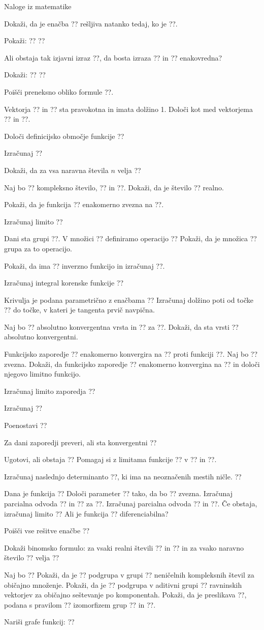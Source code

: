 \documentclass[a4paper,12pt]{article}
\begin{document}
Naloge iz matematike

Dokaži, da je enačba ??
rešljiva natanko tedaj, ko je ??.

Pokaži:
??
??

Ali obstaja tak izjavni izraz ??, da bosta izraza
?? in ??
enakovredna?

Dokaži:
??
??

Poišči preneksno obliko formule ??.

Vektorja ?? in ??
sta pravokotna in imata dolžino 1. Določi kot med vektorjema ?? in ??.

Določi definicijsko območje funkcije
??

Izračunaj
??

Dokaži, da za vsa naravna števila $n$ velja
??

Naj bo ?? kompleksno število, ?? in ??.
Dokaži, da je število ?? realno.

Pokaži, da je funkcija ?? enakomerno zvezna na ??.

Izračunaj limito
??

Dani sta grupi ??. V množici ?? definiramo operacijo
??
Pokaži, da je množica ?? grupa za to operacijo.

Pokaži, da ima ?? inverzno funkcijo in izračunaj ??.

Izračunaj integral korenske funkcije
??

Krivulja je podana parametrično z enačbama
??
Izračunaj dolžino poti od točke ?? do točke, v kateri je tangenta prvič navpična.

Naj bo ?? absolutno konvergentna vrsta in ?? za ??.
Dokaži, da sta vrsti
??
absolutno konvergentni.

Funkcijsko zaporedje ?? enakomerno konvergira na ?? proti funkciji ??.
Naj bo ?? zvezna. Dokaži, da funkcijsko zaporedje ??
enakomerno konvergina na ?? in določi njegovo limitno funkcijo.

Izračunaj limito zaporedja
??

Izračunaj
??

Poenostavi
??

Za dani zaporedji preveri, ali sta konvergentni
??

Ugotovi, ali obstaja
??
Pomagaj si z limitama funkcije ?? v ?? in ??.

Izračunaj naslednjo determinanto ??, ki ima na neoznačenih mestih ničle.
??

Dana je funkcija
??
Določi parameter ?? tako, da bo ?? zvezna.
Izračunaj parcialna odvoda ?? in ?? za ??.
Izračunaj parcialna odvoda ?? in ??.
Če obstaja, izračunaj limito
??
Ali je funkcija ?? diferenciabilna?

Poišči vse rešitve enačbe
??

Dokaži binomsko formulo: za vsaki realni števili ?? in ?? in za vsako naravno število ?? velja
??

Naj bo
??
Pokaži, da je ?? podgrupa v grupi ??
neničelnih kompleksnih števil za običajno množenje.
Pokaži, da je ?? podgrupa v aditivni grupi ??
ravninskih vektorjev za običajno seštevanje po komponentah.
Pokaži, da je preslikava ??, podana s pravilom
??
izomorfizem grup ?? in ??.

Nariši grafe funkcij:
??
\end{document}
